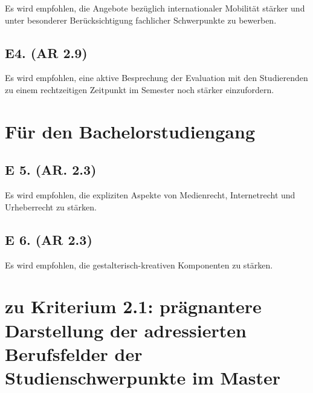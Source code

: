 Es wird empfohlen, die Angebote bezüglich internationaler Mobilität
stärker und unter besonderer Berücksichtigung fachlicher Schwerpunkte zu
bewerben.

\subsection{E4. (AR 2.9)
\label{/mi-2017/selbstbericht/auflagen/0000-auflagen}}\label{e4.-ar-2.9-pathlabelmi-2017selbstberichtauflagen0000-auflagen}

Es wird empfohlen, eine aktive Besprechung der Evaluation mit den
Studierenden zu einem rechtzeitigen Zeitpunkt im Semester noch stärker
einzufordern.

\section{Für den
Bachelorstudiengang\label{/mi-2017/selbstbericht/auflagen/0000-auflagen}}\label{fuxfcr-den-bachelorstudiengangpathlabelmi-2017selbstberichtauflagen0000-auflagen}

\subsection{E 5. (AR. 2.3)
\label{/mi-2017/selbstbericht/auflagen/0000-auflagen}}\label{e-5.-ar.-2.3-pathlabelmi-2017selbstberichtauflagen0000-auflagen}

Es wird empfohlen, die expliziten Aspekte von Medienrecht, Internetrecht
und Urheberrecht zu stärken.

\subsection{E 6. (AR 2.3)
\label{/mi-2017/selbstbericht/auflagen/0000-auflagen}}\label{e-6.-ar-2.3-pathlabelmi-2017selbstberichtauflagen0000-auflagen}

Es wird empfohlen, die gestalterisch-kreativen Komponenten zu stärken.

\section{zu Kriterium 2.1: prägnantere Darstellung der adressierten
Berufsfelder der Studienschwerpunkte im
Master\label{/mi-2017/selbstbericht/auflagen/0000-auflagen}}\label{zu-kriterium-2.1-pruxe4gnantere-darstellung-der-adressierten-berufsfelder-der-studienschwerpunkte-im-masterpathlabelmi-2017selbstberichtauflagen0000-auflagen}

